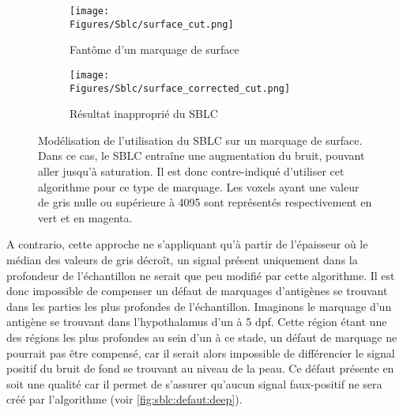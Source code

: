 \documentclass[\main/main.tex]{subfiles}
\begin{document}
\begin{figure}[h!]
    \centering
    \begin{subfigure}[b]{0.45\textwidth}
        
        \caption{Fantôme d'un marquage de surface}
        \centering \texttt{[image: \\Figures/Sblc/surface\_cut.png]}
        \label{fig:sblc:defaut:surface:fantôme}
    \end{subfigure}
    \begin{subfigure}[b]{0.45\textwidth} 
        \caption{Résultat inapproprié du SBLC}
        \centering \texttt{[image: \\Figures/Sblc/surface\_corrected\_cut.png]}
        \label{fig:sblc:defaut:surface:application}
    \end{subfigure}
    \caption{
        Modélisation de l'utilisation du SBLC sur un marquage de surface.
        \newline
        Dans ce cas, le SBLC entraîne une augmentation du bruit, pouvant aller jusqu'à saturation.
        Il est donc contre\hyp{}indiqué d'utiliser cet algorithme pour ce type de marquage.
        \newline
        Les voxels ayant une valeur de gris nulle ou supérieure à 4095 sont représentés respectivement en vert et en magenta.
        }
    \label{fig:sblc:defaut:surface}
\end{figure}

%
A contrario, cette approche ne s'appliquant qu'à partir de l'épaisseur où le médian des valeurs de gris décroît, un signal présent uniquement dans la profondeur de l'échantillon ne serait que peu modifié par cette algorithme.
%
Il est donc impossible de compenser un défaut de marquages d'antigènes se trouvant dans les parties les plus profondes de l'échantillon.
%
Imaginons le marquage d'un antigène se trouvant dans l'hypothalamus d'un \pz{} à 5 dpf.
%
Cette région étant une des régions les plus profondes au sein d'un \pz{} à ce stade, un défaut de marquage ne pourrait pas être compensé, car il serait alors impossible de différencier le signal positif du bruit de fond se trouvant au niveau de la peau.
%
Ce défaut présente en soit une qualité car il permet de s'assurer qu'aucun signal faux-positif ne sera créé par l'algorithme  (voir \autoref{fig:sblc:defaut:deep}).
\end{document}
